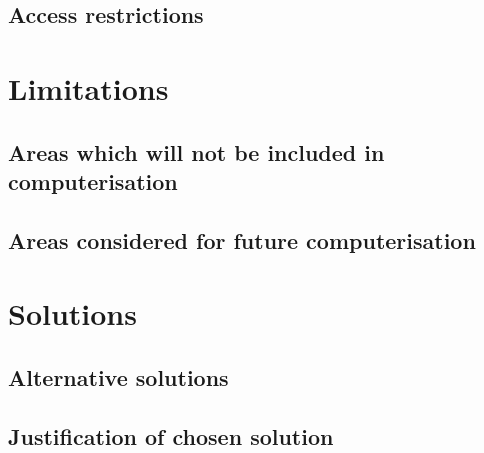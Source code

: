 \subsection{Access restrictions}

\section{Limitations}

\subsection{Areas which will not be included in computerisation}

\subsection{Areas considered for future computerisation}

\section{Solutions}

\subsection{Alternative solutions}

\subsection{Justification of chosen solution}